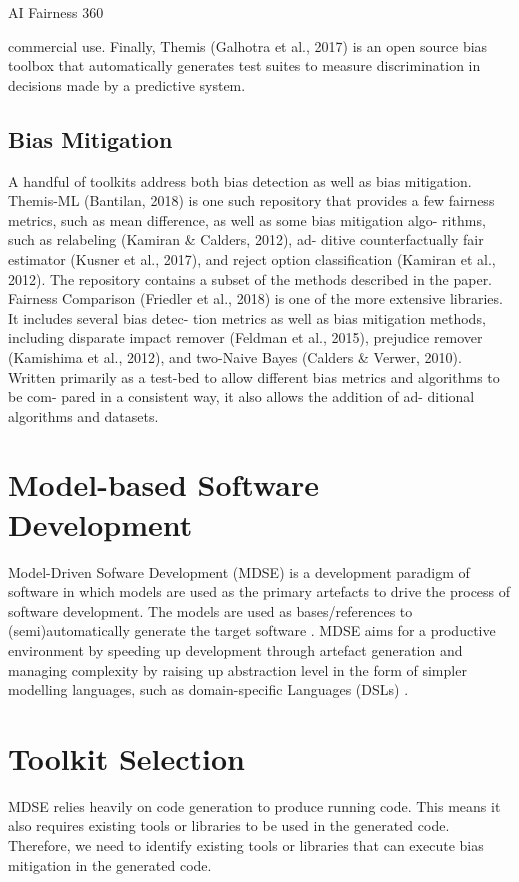 \documentclass[sigconf,review]{acmart}
\begin{document}
AI Fairness 360

commercial use. Finally, Themis (Galhotra et al., 2017) is
an open source bias toolbox that automatically generates
test suites to measure discrimination in decisions made by
a predictive system.

\subsection{Bias Mitigation}
\label{sec:bias_mitigation}

A handful of toolkits address both bias detection as well
as bias mitigation. Themis-ML (Bantilan, 2018) is one
such repository that provides a few fairness metrics, such
as mean difference, as well as some bias mitigation algo-
rithms, such as relabeling (Kamiran \& Calders, 2012), ad-
ditive counterfactually fair estimator (Kusner et al., 2017),
and reject option classiﬁcation (Kamiran et al., 2012). The
repository contains a subset of the methods described in the
paper. Fairness Comparison (Friedler et al., 2018) is one of
the more extensive libraries. It includes several bias detec-
tion metrics as well as bias mitigation methods, including
disparate impact remover (Feldman et al., 2015), prejudice
remover (Kamishima et al., 2012), and two-Naive Bayes
(Calders \& Verwer, 2010). Written primarily as a test-bed
to allow different bias metrics and algorithms to be com-
pared in a consistent way, it also allows the addition of ad-
ditional algorithms and datasets.

\section{Model-based Software Development}
\label{sec:model_based_software_development}
Model-Driven Sofware Development (MDSE) is a development paradigm of software in which models are used as the primary artefacts to drive the process of software development. The models are used as bases/references to (semi)automatically generate the target software \cite{brambilla2017model}. MDSE aims for a productive environment by speeding up development through artefact generation and managing complexity by raising up abstraction level in the form of simpler modelling languages, such as domain-specific Languages (DSLs) \cite{volter2013model}. 


\section{Toolkit Selection}
\label{sec:toolkit_selection}
MDSE relies heavily on code generation to produce running code. This means it also requires existing tools or libraries to be used in the generated code. Therefore, we need to identify existing tools or libraries that can execute bias mitigation in the generated code. 
\end{document}
